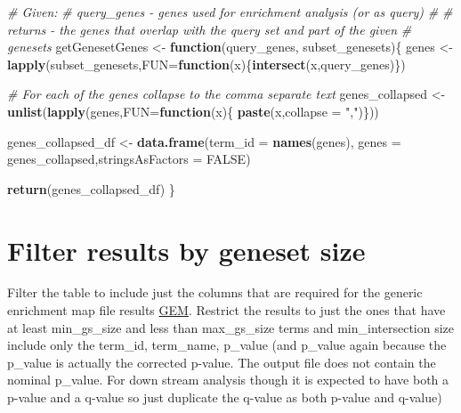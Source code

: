\documentclass[
]{book}
\newenvironment{Shaded}{\begin{snugshade}}{\end{snugshade}}
\newcommand{\AttributeTok}[1]{\textcolor[rgb]{0.13,0.29,0.53}{#1}}
\newcommand{\CommentTok}[1]{\textcolor[rgb]{0.56,0.35,0.01}{\textit{#1}}}
\newcommand{\ConstantTok}[1]{\textcolor[rgb]{0.56,0.35,0.01}{#1}}
\newcommand{\ControlFlowTok}[1]{\textcolor[rgb]{0.13,0.29,0.53}{\textbf{#1}}}
\newcommand{\FunctionTok}[1]{\textcolor[rgb]{0.13,0.29,0.53}{\textbf{#1}}}
\newcommand{\NormalTok}[1]{#1}
\newcommand{\OtherTok}[1]{\textcolor[rgb]{0.56,0.35,0.01}{#1}}
\newcommand{\StringTok}[1]{\textcolor[rgb]{0.31,0.60,0.02}{#1}}
\begin{document}
\begin{Shaded}
\begin{Highlighting}[]
\CommentTok{\# Given:}
\CommentTok{\# query\_genes {-} genes used for enrichment analysis (or as query)}
\CommentTok{\#}
\CommentTok{\# returns {-} the genes that overlap with the query set and part of the given}
\CommentTok{\#           genesets}
\NormalTok{getGenesetGenes }\OtherTok{\textless{}{-}} \ControlFlowTok{function}\NormalTok{(query\_genes, subset\_genesets)\{}
\NormalTok{  genes }\OtherTok{\textless{}{-}} \FunctionTok{lapply}\NormalTok{(subset\_genesets,}\AttributeTok{FUN=}\ControlFlowTok{function}\NormalTok{(x)\{}\FunctionTok{intersect}\NormalTok{(x,query\_genes)\})}
  
  \CommentTok{\# For each of the genes collapse to the comma separate text}
\NormalTok{  genes\_collapsed }\OtherTok{\textless{}{-}} \FunctionTok{unlist}\NormalTok{(}\FunctionTok{lapply}\NormalTok{(genes,}\AttributeTok{FUN=}\ControlFlowTok{function}\NormalTok{(x)\{}
                                                \FunctionTok{paste}\NormalTok{(x,}\AttributeTok{collapse =} \StringTok{","}\NormalTok{)\}))}
  
\NormalTok{  genes\_collapsed\_df }\OtherTok{\textless{}{-}} \FunctionTok{data.frame}\NormalTok{(}\AttributeTok{term\_id =} \FunctionTok{names}\NormalTok{(genes), }
                            \AttributeTok{genes =}\NormalTok{ genes\_collapsed,}\AttributeTok{stringsAsFactors =} \ConstantTok{FALSE}\NormalTok{)}
  
  \FunctionTok{return}\NormalTok{(genes\_collapsed\_df)}
\NormalTok{\}}
\end{Highlighting}
\end{Shaded}

\hypertarget{filter-results-by-geneset-size}{%
\section{Filter results by geneset size}\label{filter-results-by-geneset-size}}

Filter the table to include just the columns that are required for the generic enrichment map file results \href{https://enrichmentmap.readthedocs.io/en/latest/FileFormats.html\#generic-results-files}{GEM}. Restrict the results to just the ones that have at least min\_gs\_size and less than max\_gs\_size terms and min\_intersection size include only the term\_id, term\_name, p\_value (and p\_value again because the p\_value is actually the corrected p-value. The output file does not contain the nominal p\_value. For down stream analysis though it is expected to have both a p-value and a q-value so just duplicate the q-value as both p-value and q-value)
\end{document}
